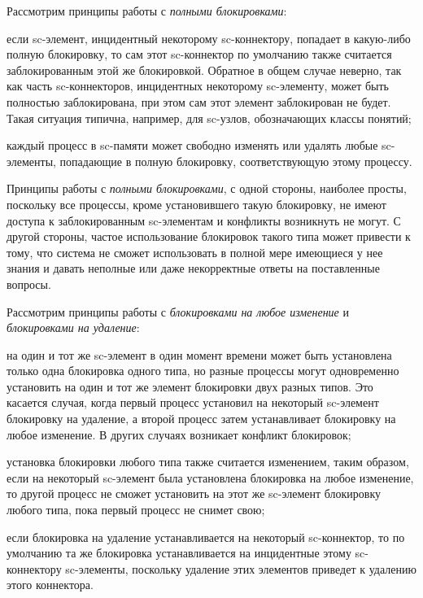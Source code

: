 Рассмотрим принципы работы с \textit{полными блокировками}:
\begin{textitemize}
	\item если sc-элемент, инцидентный некоторому sc-коннектору, попадает в какую-либо полную блокировку, то сам этот sc-коннектор по умолчанию также считается заблокированным этой же блокировкой. Обратное в общем случае неверно, так как часть sc-коннекторов, инцидентных некоторому sc-элементу, может быть полностью заблокирована, при этом сам этот элемент заблокирован не будет. Такая ситуация типична, например, для sc-узлов, обозначающих классы понятий;
	\item каждый процесс в sc-памяти может свободно изменять или удалять любые sc-элементы, попадающие в полную блокировку, соответствующую этому процессу.
\end{textitemize}

Принципы работы с \textit{полными блокировками}, с одной стороны, наиболее просты, поскольку все процессы, кроме установившего такую блокировку, не имеют доступа к заблокированным \mbox{sc-элементам} и конфликты возникнуть не могут. С другой стороны, частое использование блокировок такого типа может привести к тому, что система не сможет использовать в полной мере имеющиеся у нее знания и давать неполные или даже некорректные ответы на поставленные вопросы.

Рассмотрим принципы работы с \textit{блокировками на любое изменение} и \textit{блокировками на удаление}:
\begin{textitemize}
	\item на один и тот же sc-элемент в один момент времени может быть установлена только одна блокировка одного типа, но разные процессы могут одновременно установить на один и тот же элемент блокировки двух разных типов. Это касается случая, когда первый процесс установил на некоторый sc-элемент блокировку на удаление, а второй процесс затем устанавливает блокировку на любое изменение. В других случаях возникает конфликт блокировок;
	\item установка блокировки любого типа также считается изменением, таким образом, если на некоторый \mbox{sc-элемент} была установлена блокировка на любое изменение, то другой процесс не сможет установить на этот же sc-элемент блокировку любого типа, пока первый процесс не снимет свою;
	\item если блокировка на удаление устанавливается на некоторый sc-коннектор, то по умолчанию та же блокировка устанавливается на инцидентные этому sc-коннектору sc-элементы, поскольку удаление этих элементов приведет к удалению этого коннектора.
\end{textitemize}


